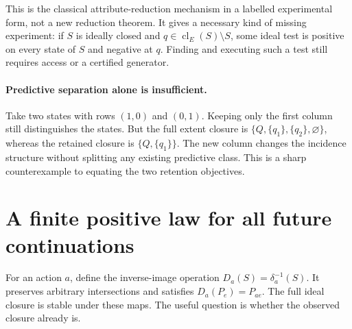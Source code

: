 \documentclass[11pt]{article}
\theoremstyle{remark}
\newcommand{\cl}{\operatorname{cl}}
\begin{document}
This is the classical attribute-reduction mechanism in a labelled experimental form, not a new reduction theorem. It gives a necessary kind of missing experiment: if $S$ is ideally closed and $q\in\cl_E(S)\setminus S$, some ideal test is positive on every state of $S$ and negative at $q$. Finding and executing such a test still requires access or a certified generator.

\paragraph{Predictive separation alone is insufficient.}
Take two states with rows $(1,0)$ and $(0,1)$. Keeping only the first column still distinguishes the states. But the full extent closure is $\{Q,\{q_1\},\{q_2\},\varnothing\}$, whereas the retained closure is $\{Q,\{q_1\}\}$. The new column changes the incidence structure without splitting any existing predictive class. This is a sharp counterexample to equating the two retention objectives.

\section{A finite positive law for all future continuations}
\label{sec:saturation}

For an action $a$, define the inverse-image operation $D_a(S)=\delta_a^{-1}(S)$. It preserves arbitrary intersections and satisfies $D_a(P_e)=P_{ae}$. The full ideal closure is stable under these maps. The useful question is whether the observed closure already is.
\end{document}
